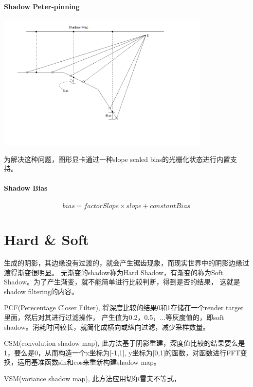 \paragraph{Shadow Peter-pinning}
\begin{center}
    \includegraphics[width=0.8\textwidth]{images/shadow_peter-pinning.png}
\end{center}
为解决这种问题，图形显卡通过一种slope scaled bias的光栅化状态进行内置支持。

\paragraph{Shadow Bias}

\begin{gather*}
    bias = factorSlope \times slope + constantBias
\end{gather*}

\section{Hard \& Soft}
生成的阴影，其边缘没有过渡的，就会产生锯齿现象，而现实世界中的阴影边缘过渡得渐变很明显。
无渐变的shadow称为Hard Shadow，有渐变的称为Soft Shadow。为了产生渐变，就不能简单进行比较判断，得到是否的结果，
这就是shadow filtering的内容。

PCF(Perecentage Closer Filter), 将深度比较的结果0和1存储在一个render target里面，然后对其进行过滤操作，
产生值为0.2，0.5，...等灰度值的，即soft shadow。消耗时间较长，就简化成横向或纵向过滤，减少采样数量。

CSM(convolution shadow map), 此方法基于阴影重建，深度值比较的结果要么是1，要么是0，从而构造一个x坐标为[-1,1],
y坐标为[0,1]的函数，对函数进行FFT变换，运用基准函数sin和cos来重新构建shadow map。 

VSM(variance shadow map), 此方法应用切尔雪夫不等式，

